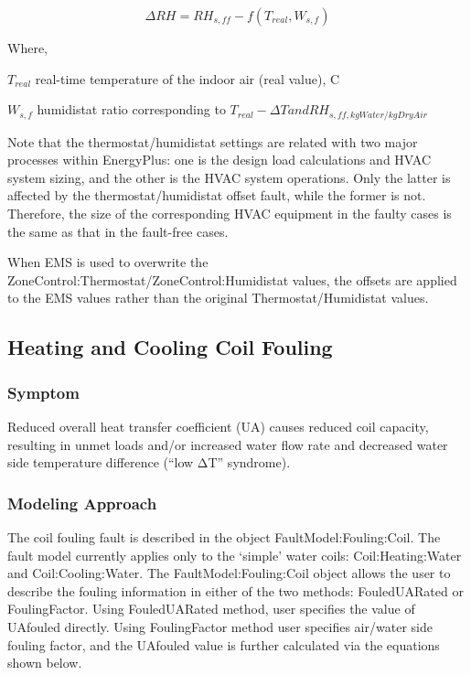 \begin{equation}
\Delta RH = RH_{s,ff} - f(T_{real}, W_{s,f})
\end{equation}

Where,

\(T_{real}\) real-time temperature of the indoor air (real value), C

\(W_{s,f}\) humidistat ratio corresponding to \(T_{real} - \Delta T and RH_{s,ff, kgWater/kgDryAir}\)

Note that the thermostat/humidistat settings are related with two major processes within EnergyPlus: one is the design load calculations and HVAC system sizing, and the other is the HVAC system operations. Only the latter is affected by the thermostat/humidistat offset fault, while the former is not. Therefore, the size of the corresponding HVAC equipment in the faulty cases is the same as that in the fault-free cases.

When EMS is used to overwrite the ZoneControl:Thermostat/ZoneControl:Humidistat values, the offsets are applied to the EMS values rather than the original Thermostat/Humidistat values.

\subsection{Heating and Cooling Coil Fouling}\label{heating-and-cooling-coil-fouling}

\subsubsection{Symptom}\label{symptom-2}

Reduced overall heat transfer coefficient (UA) causes reduced coil capacity, resulting in unmet loads and/or increased water flow rate and decreased water side temperature difference (``low ΔT'' syndrome).

\subsubsection{Modeling Approach}\label{modeling-approach-2}

The coil fouling fault is described in the object FaultModel:Fouling:Coil. The fault model currently applies only to the `simple' water coils: Coil:Heating:Water and Coil:Cooling:Water. The FaultModel:Fouling:Coil object allows the user to describe the fouling information in either of the two methods: FouledUARated or FoulingFactor. Using FouledUARated method, user specifies the value of UAfouled directly. Using FoulingFactor method user specifies air/water side fouling factor, and the UAfouled value is further calculated via the equations shown below.

